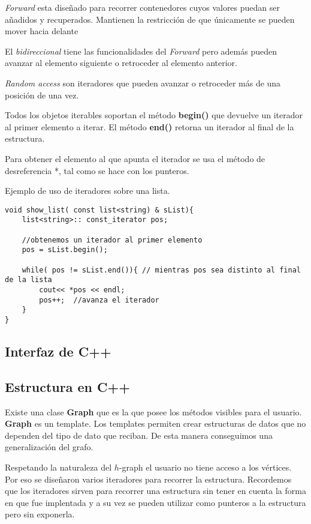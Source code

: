 \documentclass[a4paper,12pt]{article}
\begin{document}
 \emph{Forward} esta diseñado para recorrer contenedores cuyos valores puedan ser añadidos y recuperados. Mantienen la restricción de que únicamente se pueden mover hacia delante

El  \emph{bidireccional}  tiene las funcionalidades del \emph{Forward} pero además  pueden avanzar al elemento siguiente o retroceder al elemento anterior.

\emph{Random access} son iteradores que pueden avanzar o retroceder más de una posición de una vez.

Todos los objetos iterables soportan el método \textbf{begin()} que devuelve un iterador al primer elemento a iterar.
El método \textbf{end()} retorna un iterador al final de la estructura. 

Para obtener el elemento al que apunta el iterador se usa el método de desreferencia *, tal como se hace con los punteros.



Ejemplo de uso de iteradores sobre una lista.



\lstset{language=C, breaklines=true, basicstyle=\footnotesize}
\begin{lstlisting}[frame=single]
void show_list( const list<string) & sList){
	list<string>:: const_iterator pos;
    
    //obtenemos un iterador al primer elemento
    pos = sList.begin();
    
    while( pos != sList.end()){ // mientras pos sea distinto al final de la lista
    	cout<< *pos << endl;
        pos++;  //avanza el iterador
    }
}
\end{lstlisting}



\subsection{Interfaz de C++}




\subsection{Estructura en C++}
Existe una clase \textbf{Graph} que es la que posee los métodos visibles para el usuario.
\textbf{Graph} es un template. Los templates permiten crear estructuras de datos que no dependen del tipo de dato que reciban. De esta manera conseguimos una generalización del grafo.

Respetando la naturaleza del $h$-graph el usuario no tiene acceso a los vértices. Por eso se diseñaron varios iteradores para recorrer la estructura.
Recordemos que los iteradores sirven para recorrer una estructura sin tener en cuenta la forma en que fue implentada y a su vez se pueden utilizar como punteros a la estructura pero sin exponerla.
\end{document}
